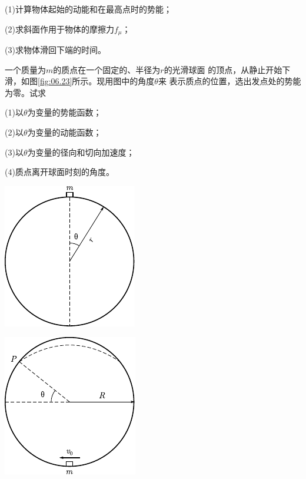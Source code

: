 \begin{exercises}
(1)计算物体起始的动能和在最高点时的势能；

(2)求斜面作用于物体的摩擦力$ f _ { \mu } $；

(3)求物体滑回下端的时间。

\exercise 一个质量为$ m $的质点在一个固定的、半径为$ r $的光滑球面
的顶点，从静止开始下滑，如图\ref{fig:06.23}\;所示。现用图中的角度$ \theta $来
表示质点的位置，选出发点处的势能为零。试求

(1)以$ \theta $为变量的势能函数；

(2)以$ \theta $为变量的动能函数；

(3)以$ \theta $为变量的径向和切向加速度；

(4)质点离开球面时刻的角度。
\vspace{1.56em}
\begin{figurex}
    \begin{minipage}[b]{0.5\linewidth}
        \centering
        \includegraphics{figure/fig06.23}
        \caption{}
        \label{fig:06.23}
    \end{minipage}
    \hfill
    \begin{minipage}[b]{0.5\linewidth}
        \centering
        \includegraphics{figure/fig06.24}
        \caption{}
        \label{fig:06.24}
    \end{minipage}
\end{figurex}


\end{exercises}
